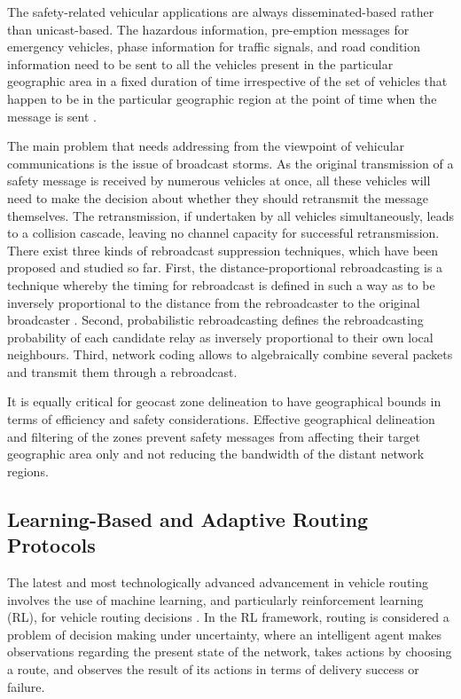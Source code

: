 \documentclass[12pt]{article}
\begin{document}
The safety-related vehicular applications are always disseminated-based rather than unicast-based. The hazardous information, pre-emption messages for emergency vehicles, phase information for traffic signals, and road condition information need to be sent to all the vehicles present in the particular geographic area in a fixed duration of time irrespective of the set of vehicles that happen to be in the particular geographic region at the point of time when the message is sent \cite{vegni2015survey}.

The main problem that needs addressing from the viewpoint of vehicular communications is the issue of broadcast storms. As the original transmission of a safety message is received by numerous vehicles at once, all these vehicles will need to make the decision about whether they should retransmit the message themselves. The retransmission, if undertaken by all vehicles simultaneously, leads to a collision cascade, leaving no channel capacity for successful retransmission. There exist three kinds of rebroadcast suppression techniques, which have been proposed and studied so far. First, the distance-proportional rebroadcasting is a technique whereby the timing for rebroadcast is defined in such a way as to be inversely proportional to the distance from the rebroadcaster to the original broadcaster \cite{dressler2018not}. Second, probabilistic rebroadcasting defines the rebroadcasting probability of each candidate relay as inversely proportional to their own local neighbours. Third, network coding allows to algebraically combine several packets and transmit them through a rebroadcast.

It is equally critical for geocast zone delineation to have geographical bounds in terms of efficiency and safety considerations. Effective geographical delineation and filtering of the zones prevent safety messages from affecting their target geographic area only and not reducing the bandwidth of the distant network regions.

\subsection{Learning-Based and Adaptive Routing Protocols}

The latest and most technologically advanced advancement in vehicle routing involves the use of machine learning, and particularly reinforcement learning (RL), for vehicle routing decisions \cite{wang2020deep}. In the RL framework, routing is considered a problem of decision making under uncertainty, where an intelligent agent makes observations regarding the present state of the network, takes actions by choosing a route, and observes the result of its actions in terms of delivery success or failure.
\end{document}
